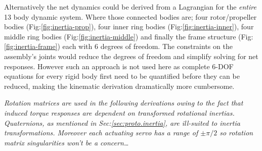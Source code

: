 \par
Alternatively the net dynamics could be derived from a Lagrangian for the \emph{entire} 13 body dynamic system. Where those connected bodies are; four rotor/propeller bodies (Fig:\ref{fig:inertia-prop}), four inner ring bodies (Fig:\ref{fig:inertia-inner}), four middle ring bodies (Fig:\ref{fig:inertia-middle}) and finally the frame structure (Fig:\ref{fig:inertia-frame}) each with 6 degrees of freedom. The constraints on the assembly's joints would reduce the degrees of freedom and simplify solving for net responses. However such an approach is not used here as complete 6-DOF equations for every rigid body first need to be quantified before they can be reduced, making the kinematic derivation dramatically more cumbersome.
\par
\emph{\color{gray}Rotation matrices are used in the following derivations owing to the fact that induced torque responses are dependent on transformed rotational inertias. Quaternions, as mentioned in Sec:\ref{sec:proto.inertia}, are ill-suited to inertia transformations. Moreover each actuating servo has a range of $\pm\pi/2$ so rotation matrix singularities won't be a concern\ldots}

